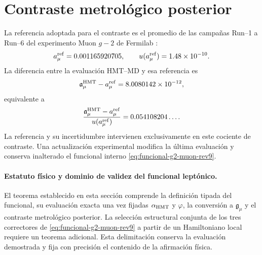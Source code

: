 \section{Contraste metrológico posterior}
\label{sec:contraste-g2-muon-rev9}

La referencia adoptada para el contraste es el promedio de las campañas
Run--1 a Run--6 del experimento Muon \(g-2\) de Fermilab
\cite{MuonGMinus2_2025}:
\[
 a_\mu^{\rm ref}=0.001165920705,
 \qquad
 u(a_\mu^{\rm ref})=1.48\times10^{-10}.
\]
La diferencia entre la evaluación HMT--MD y esa referencia es
\[
 \mathfrak a_\mu^{\rm HMT}-a_\mu^{\rm ref}
 =8.0080142\times10^{-12},
\]
equivalente a
\[
 \frac{\mathfrak a_\mu^{\rm HMT}-a_\mu^{\rm ref}}
 {u(a_\mu^{\rm ref})}
 =0.054108204\ldots.
\]
La referencia y su incertidumbre intervienen exclusivamente en este cociente
de contraste. Una actualización experimental modifica la última evaluación y
conserva inalterado el funcional interno
\eqref{eq:funcional-g2-muon-rev9}.

\paragraph{Estatuto físico y dominio de validez del funcional leptónico.}
El teorema establecido en esta sección comprende la definición tipada del
funcional, su evaluación exacta una vez fijadas
\(\alpha_{\rm HMT}\) y \(\varphi\), la conversión a
\(\mathfrak g_\mu\) y el contraste metrológico posterior. La selección
estructural conjunta de los tres correctores de
\eqref{eq:funcional-g2-muon-rev9} a partir de un Hamiltoniano local requiere
un teorema adicional. Esta delimitación conserva la evaluación demostrada y
fija con precisión el contenido de la afirmación física.
